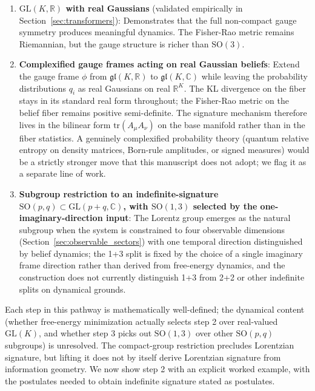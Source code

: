 \documentclass[11pt]{article}
\begin{document}
\begin{enumerate}
\item \textbf{$\mathrm{GL}(K, \mathbb{R})$ with real Gaussians} (validated empirically in Section~\ref{sec:transformers}): Demonstrates that the full non-compact gauge symmetry produces meaningful dynamics. The Fisher-Rao metric remains Riemannian, but the gauge structure is richer than $\mathrm{SO}(3)$.

\item \textbf{Complexified gauge frames acting on real Gaussian beliefs}: Extend the gauge frame $\phi$ from $\mathfrak{gl}(K, \mathbb{R})$ to $\mathfrak{gl}(K, \mathbb{C})$ while leaving the probability distributions $q_i$ as real Gaussians on real $\mathbb{R}^K$. The KL divergence on the fiber stays in its standard real form throughout; the Fisher-Rao metric on the belief fiber remains positive semi-definite. The signature mechanism therefore lives in the bilinear form $\mathrm{tr}(A_\mu A_\nu)$ on the base manifold rather than in the fiber statistics. A genuinely complexified probability theory (quantum relative entropy on density matrices, Born-rule amplitudes, or signed measures) would be a strictly stronger move that this manuscript does not adopt; we flag it as a separate line of work.

\item \textbf{Subgroup restriction to an indefinite-signature $\mathrm{SO}(p,q) \subset \mathrm{GL}(p{+}q, \mathbb{C})$, with $\mathrm{SO}(1,3)$ selected by the one-imaginary-direction input}: The Lorentz group emerges as the natural subgroup when the system is constrained to four observable dimensions (Section~\ref{sec:observable_sectors}) with one temporal direction distinguished by belief dynamics; the 1+3 split is fixed by the choice of a single imaginary frame direction rather than derived from free-energy dynamics, and the construction does not currently distinguish 1+3 from 2+2 or other indefinite splits on dynamical grounds.
\end{enumerate}

Each step in this pathway is mathematically well-defined; the dynamical content (whether free-energy minimization actually selects step 2 over real-valued $\mathrm{GL}(K)$, and whether step 3 picks out $\mathrm{SO}(1,3)$ over other $\mathrm{SO}(p,q)$ subgroups) is unresolved. The compact-group restriction precludes Lorentzian signature, but lifting it does not by itself derive Lorentzian signature from information geometry. We now show step 2 with an explicit worked example, with the postulates needed to obtain indefinite signature stated as postulates.
\end{document}
